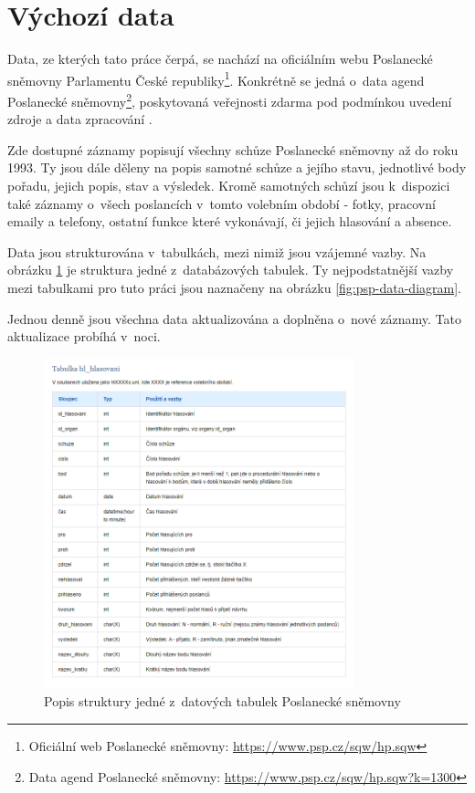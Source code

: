 \section{Výchozí data}
Data, ze kterých tato práce čerpá, se nachází na oficiálním webu Poslanecké sněmovny Parlamentu České republiky\footnote{Oficiální web Poslanecké sněmovny: \url{https://www.psp.cz/sqw/hp.sqw}}. Konkrétně se jedná o~data agend Poslanecké sněmovny\footnote{Data agend Poslanecké sněmovny: \url{https://www.psp.cz/sqw/hp.sqw?k=1300}}, poskytovaná veřejnosti zdarma pod podmínkou uvedení zdroje a data zpracování \cite{pspData}.
\par Zde dostupné záznamy popisují všechny schůze Poslanecké sněmovny až do roku 1993. Ty jsou dále děleny na popis samotné schůze a jejího stavu, jednotlivé body pořadu, jejich popis, stav a výsledek. Kromě samotných schůzí jsou k~dispozici také záznamy o~všech poslancích v~tomto volebním období - fotky, pracovní emaily a telefony, ostatní funkce které vykonávají, či jejich hlasování a absence.
\par Data jsou strukturována v~tabulkách, mezi nimiž jsou vzájemné vazby. Na obrázku \ref{fig:psp-tabulka-priklad} je struktura jedné z~databázových tabulek. Ty nejpodstatnější vazby mezi tabulkami pro tuto práci jsou naznačeny na obrázku \ref{fig:psp-data-diagram}.
\par Jednou denně jsou všechna data aktualizována a doplněna o~nové záznamy. Tato aktualizace probíhá v~noci.



\begin{figure}
    \centering
    \includegraphics[width=0.8\textwidth]{obrazky-figures/psp-tabulka-priklad.png}
    \caption{Popis struktury jedné z~datových tabulek Poslanecké sněmovny\cite{pspData}}
    \label{fig:psp-tabulka-priklad}
\end{figure}

